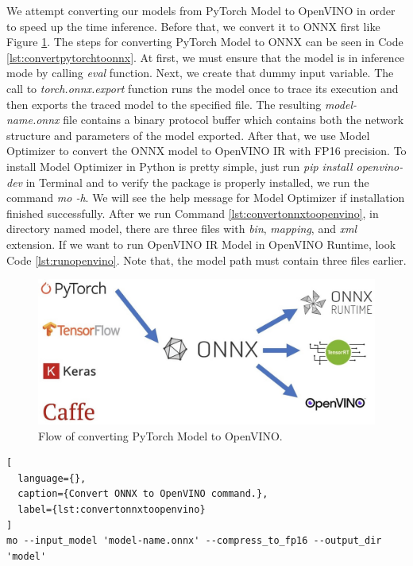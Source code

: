 

We attempt converting our models from PyTorch Model to OpenVINO in order to speed up the time inference. Before that, we convert it to ONNX first like Figure \ref{fig:pytorch-to-openvino}.
The steps for converting PyTorch Model to ONNX can be seen in Code \ref{lst:convertpytorchtoonnx}. At first, we must ensure that the model is in inference mode by calling \emph{eval} function.
Next, we create that dummy input variable. The call to \emph{torch.onnx.export} function runs the model once to trace its execution and then exports the traced model to the specified file.
The resulting \emph{model-name.onnx} file contains a binary protocol buffer which contains both the network structure and parameters of the model exported.
After that, we use Model Optimizer to convert the ONNX model to OpenVINO IR with FP16 precision. To install Model Optimizer in Python is pretty simple, just run
\emph{pip install openvino-dev} in Terminal and to verify the package is properly installed, we run the command \emph{mo -h}. We will see the help message for Model Optimizer if installation finished successfully.
After we run Command \ref{lst:convertonnxtoopenvino}, in directory named model, there are three files with \emph{bin}, \emph{mapping}, and \emph{xml} extension.
If we want to run OpenVINO IR Model in OpenVINO Runtime, look Code \ref{lst:runopenvino}. Note that, the model path must contain three files earlier.



\begin{figure}[ht]
  \centering
  \includegraphics[scale=0.45]{gambar/pytorch-onnx-openvino.jpg}
  \caption{Flow of converting PyTorch Model to OpenVINO.}
  \label{fig:pytorch-to-openvino}
\end{figure}

\begin{lstlisting}[
  language={},
  caption={Convert ONNX to OpenVINO command.},
  label={lst:convertonnxtoopenvino}
]
mo --input_model 'model-name.onnx' --compress_to_fp16 --output_dir 'model'
\end{lstlisting}

